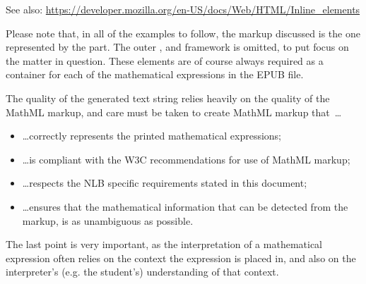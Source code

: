 \documentclass[english,a4paper,11pt]{article}
\begin{document}
See also: \url{https://developer.mozilla.org/en-US/docs/Web/HTML/Inline_elements}

\bigskip

Please note that, in all of the examples to follow, the markup discussed is the one represented by the  part. The outer ,  and  framework is omitted, to put focus on the matter in question. These elements are of course always required as a container for each of the mathematical expressions in the EPUB file.

\begin{center}
\end{center}
The quality of the generated text string relies heavily on the quality of the MathML markup, and care must be taken to create MathML markup that~\ldots
\begin{itemize}
	\item \ldots correctly represents the printed mathematical expressions;
	\item \ldots is compliant with the W3C recommendations for use of MathML markup;
	\item \ldots respects the NLB specific requirements stated in this document;
	\item \ldots ensures that the mathematical information that can be detected from the markup, is as unambiguous as possible.
\end{itemize}
The last point is very important, as the interpretation of a mathematical expression often relies on the context  the expression is placed in, and also on the interpreter's (e.g. the student's) understanding of that context.
\end{document}
